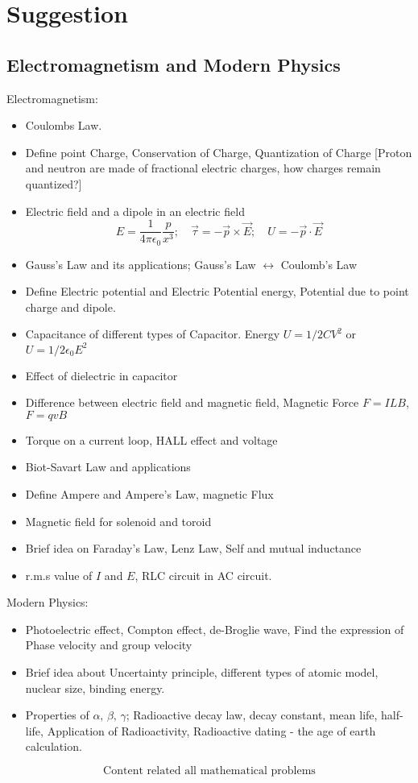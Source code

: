 \documentclass[../main.tex]{subfiles}
\begin{document}
\chapter{Suggestion}
\section{Electromagnetism and Modern Physics}
Electromagnetism:
\begin{itemize}
    \item Coulombs Law.
    \item Define point Charge, Conservation of Charge, Quantization of Charge [Proton and neutron are made of fractional electric charges, how charges remain quantized?]
    \item Electric field and a dipole in an electric field
    \[E=\frac{1}{4\pi \epsilon_0}\frac{p}{x^3};\quad\vec{\tau}=-\vec{p}\times\vec{E};\quad U=-\vec{p}\cdot\vec{E}\]
    \item Gauss's Law and its applications; Gauss's Law $ \leftrightarrow $ Coulomb's Law
    \item Define Electric potential and Electric Potential energy, Potential due to point charge and dipole.
    \item Capacitance of different types of Capacitor. Energy $ U=1/2 CV^2 $ or $ U=1/2 \epsilon_0 E^2 $
    \item Effect of dielectric in capacitor
    \item Difference between electric field and magnetic field, Magnetic Force $ F=ILB $, $ F=qvB $
    \item Torque on a current loop, HALL effect and voltage
    \item Biot-Savart Law and applications
    \item Define Ampere and Ampere's Law, magnetic Flux
    \item Magnetic field for solenoid and toroid
    \item Brief idea on Faraday's Law, Lenz Law, Self and mutual inductance
    \item r.m.s value of $ I $ and $ E $, RLC circuit in AC circuit.
\end{itemize}
\newpage
Modern Physics:
\begin{itemize}
    \item Photoelectric effect, Compton effect, de-Broglie wave, Find the expression of Phase velocity and group velocity
    \item Brief idea about Uncertainty principle, different types of atomic model, nuclear size, binding energy.
    \item Properties of $ \alpha,\, \beta,\,\gamma $; Radioactive decay law, decay constant, mean life, half-life, Application of Radioactivity, Radioactive dating - the age of earth calculation.
\end{itemize}
\[\boxed{\text{Content related all mathematical problems}}\]
\end{document}
